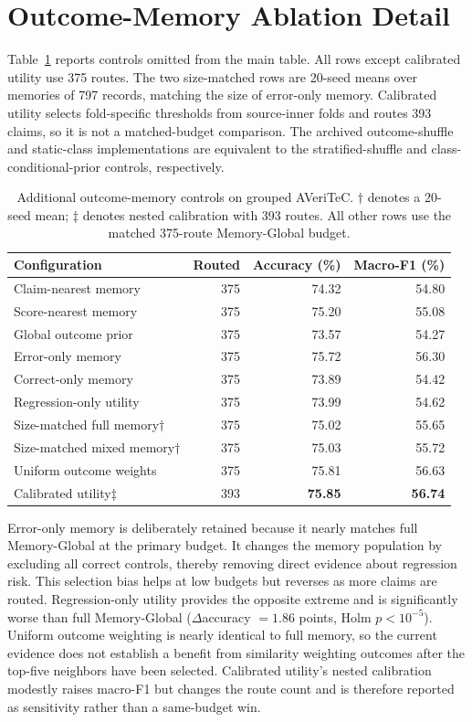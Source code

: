 \documentclass[runningheads]{llncs}
\begin{document}
\section{Outcome-Memory Ablation Detail}
\label{sec:memory-appendix}

Table~\ref{tab:memory-appendix} reports controls omitted from the main table.
All rows except calibrated utility use 375 routes. The two size-matched rows
are 20-seed means over memories of 797 records, matching the size of error-only
memory. Calibrated utility selects fold-specific thresholds from source-inner
folds and routes 393 claims, so it is not a matched-budget comparison. The
archived outcome-shuffle and static-class implementations are equivalent to
the stratified-shuffle and class-conditional-prior controls, respectively.

\begin{table}[t]
\caption{Additional outcome-memory controls on grouped AVeriTeC. $\dagger$
denotes a 20-seed mean; $\ddagger$ denotes nested calibration with 393 routes.
All other rows use the matched 375-route Memory-Global budget.}
\label{tab:memory-appendix}
\centering\small
\begin{tabular}{lrrr}
\toprule
Configuration & Routed & Accuracy (\%) & Macro-F1 (\%) \\
\midrule
Claim-nearest memory & 375 & 74.32 & 54.80 \\
Score-nearest memory & 375 & 75.20 & 55.08 \\
Global outcome prior & 375 & 73.57 & 54.27 \\
Error-only memory & 375 & 75.72 & 56.30 \\
Correct-only memory & 375 & 73.89 & 54.42 \\
Regression-only utility & 375 & 73.99 & 54.62 \\
Size-matched full memory$\dagger$ & 375 & 75.02 & 55.65 \\
Size-matched mixed memory$\dagger$ & 375 & 75.03 & 55.72 \\
Uniform outcome weights & 375 & 75.81 & 56.63 \\
Calibrated utility$\ddagger$ & 393 & \textbf{75.85} & \textbf{56.74} \\
\bottomrule
\end{tabular}
\end{table}

Error-only memory is deliberately retained because it nearly matches full
Memory-Global at the primary budget. It changes the memory population by excluding all correct controls,
thereby removing direct evidence about regression risk. This selection bias
helps at low budgets but reverses as more claims are routed. Regression-only
utility provides the opposite extreme and is significantly worse than full
Memory-Global ($\Delta$accuracy $=1.86$ points, Holm $p<10^{-5}$). Uniform
outcome weighting is nearly identical to full memory, so the current evidence
does not establish a benefit from similarity weighting outcomes after the
top-five neighbors have been selected. Calibrated utility's
nested calibration modestly raises macro-F1 but changes the route count and is
therefore reported as sensitivity rather than a same-budget win.
\end{document}
